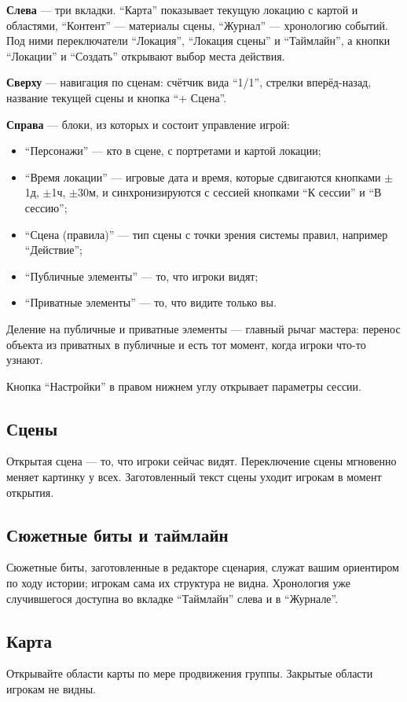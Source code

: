 \textbf{Слева} --- три вкладки. ``Карта'' показывает текущую локацию с картой и областями, ``Контент'' --- материалы сцены, ``Журнал'' --- хронологию событий. Под ними переключатели ``Локация'', ``Локация сцены'' и ``Таймлайн'', а кнопки ``Локации'' и ``Создать'' открывают выбор места действия.

\textbf{Сверху} --- навигация по сценам: счётчик вида ``1/1'', стрелки вперёд-назад, название текущей сцены и кнопка ``+ Сцена''.

\textbf{Справа} --- блоки, из которых и состоит управление игрой:

\begin{itemize}
\item ``Персонажи'' --- кто в сцене, с портретами и картой локации;
\item ``Время локации'' --- игровые дата и время, которые сдвигаются кнопками $\pm$1д, $\pm$1ч, $\pm$30м, и синхронизируются с сессией кнопками ``К сессии'' и ``В сессию'';
\item ``Сцена (правила)'' --- тип сцены с точки зрения системы правил, например ``Действие'';
\item ``Публичные элементы'' --- то, что игроки видят;
\item ``Приватные элементы'' --- то, что видите только вы.
\end{itemize}

Деление на публичные и приватные элементы --- главный рычаг мастера: перенос объекта из приватных в публичные и есть тот момент, когда игроки что-то узнают.

Кнопка ``Настройки'' в правом нижнем углу открывает параметры сессии.

\subsection{Сцены}
Открытая сцена --- то, что игроки сейчас видят. Переключение сцены мгновенно меняет картинку у всех. Заготовленный текст сцены уходит игрокам в момент открытия.

\subsection{Сюжетные биты и таймлайн}
Сюжетные биты, заготовленные в редакторе сценария, служат вашим ориентиром по ходу истории; игрокам сама их структура не видна. Хронология уже случившегося доступна во вкладке ``Таймлайн'' слева и в ``Журнале''.

\subsection{Карта}
Открывайте области карты по мере продвижения группы. Закрытые области игрокам не видны.

